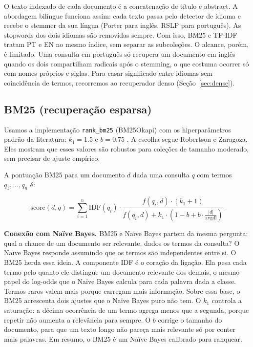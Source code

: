 \documentclass[12pt]{article}
\begin{document}
O texto indexado de cada documento é a concatenação de título e abstract. A abordagem bilíngue funciona assim: cada texto passa pelo detector de idioma e recebe o stemmer da sua língua (Porter para inglês, RSLP para português). As stopwords dos dois idiomas são removidas sempre. Com isso, BM25 e TF-IDF tratam PT e EN no mesmo índice, sem separar as subcoleções. O alcance, porém, é limitado. Uma consulta em português só recupera um documento em inglês quando os dois compartilham radicais após o stemming, o que costuma ocorrer só com nomes próprios e siglas. Para casar significado entre idiomas sem coincidência de termos, recorremos ao recuperador denso (Seção~\ref{sec:dense}).

\subsection{BM25 (recuperação esparsa)}

Usamos a implementação \texttt{rank\_bm25} (BM25Okapi) com os hiperparâmetros padrão da literatura: $k_1=1.5$ e $b=0.75$ \cite{robertson2009}. A escolha segue Robertson e Zaragoza. Eles mostram que esses valores são robustos para coleções de tamanho moderado, sem precisar de ajuste empírico.

A pontuação BM25 para um documento $d$ dada uma consulta $q$ com termos $q_1, \ldots, q_n$ é:

\begin{equation}
\text{score}(d, q) = \sum_{i=1}^{n} \text{IDF}(q_i) \cdot \frac{f(q_i, d) \cdot (k_1 + 1)}{f(q_i, d) + k_1 \cdot (1 - b + b \cdot \frac{|d|}{\text{avgdl}})}
\end{equation}

\textbf{Conexão com Naïve Bayes.} BM25 e Naïve Bayes partem da mesma pergunta: qual a chance de um documento ser relevante, dados os termos da consulta? O Naïve Bayes responde assumindo que os termos são independentes entre si. O BM25 herda essa ideia. A componente IDF é o coração da ligação. Ela pesa cada termo pelo quanto ele distingue um documento relevante dos demais, o mesmo papel do log-odds que o Naïve Bayes calcula para cada palavra dada a classe. Termos raros valem mais porque carregam mais informação. Sobre essa base, o BM25 acrescenta dois ajustes que o Naïve Bayes puro não tem. O $k_1$ controla a saturação: a décima ocorrência de um termo agrega menos que a segunda, porque repetir não aumenta a relevância para sempre. O $b$ corrige o tamanho do documento, para que um texto longo não pareça mais relevante só por conter mais palavras. Em resumo, o BM25 é um Naïve Bayes calibrado para ranquear.
\end{document}
